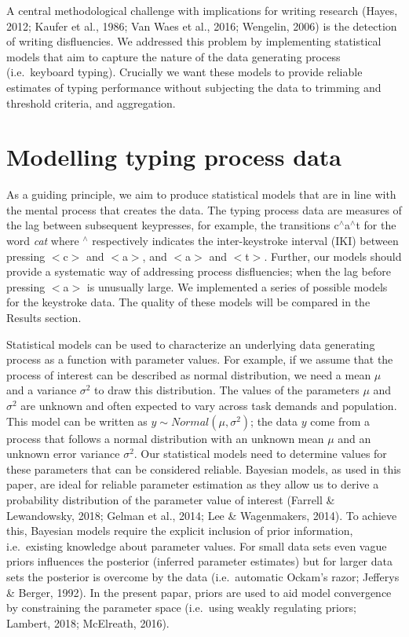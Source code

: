 \documentclass[english,man,floatsintext]{apa7}
\begin{document}
A central methodological challenge with implications for writing research (Hayes, 2012; Kaufer et al., 1986; Van Waes et al., 2016; Wengelin, 2006) is the detection of writing disfluencies. We addressed this problem by implementing statistical models that aim to capture the nature of the data generating process (i.e.~keyboard typing). Crucially we want these models to provide reliable estimates of typing performance without subjecting the data to trimming and threshold criteria, and aggregation.

\hypertarget{modelling-typing-process-data}{%
\section{Modelling typing process data}\label{modelling-typing-process-data}}

As a guiding principle, we aim to produce statistical models that are in line with the mental process that creates the data. The typing process data are measures of the lag between subsequent keypresses, for example, the transitions c\(^{\wedge}\)a\(^{\wedge}\)t for the word \emph{cat} where \(^{\wedge}\) respectively indicates the inter-keystroke interval (IKI) between pressing \(<\)c\(>\) and \(<\)a\(>\), and \(<\)a\(>\) and \(<\)t\(>\). Further, our models should provide a systematic way of addressing process disfluencies; when the lag before pressing \(<\)a\(>\) is unusually large. We implemented a series of possible models for the keystroke data. The quality of these models will be compared in the Results section.

Statistical models can be used to characterize an underlying data generating process as a function with parameter values. For example, if we assume that the process of interest can be described as normal distribution, we need a mean \(\mu\) and a variance \(\sigma^2\) to draw this distribution. The values of the parameters \(\mu\) and \(\sigma^2\) are unknown and often expected to vary across task demands and population. This model can be written as \(y \sim Normal(\mu, \sigma^2)\); the data \(y\) come from a process that follows a normal distribution with an unknown mean \(\mu\) and an unknown error variance \(\sigma^2\). Our statistical models need to determine values for these parameters that can be considered reliable. Bayesian models, as used in this paper, are ideal for reliable parameter estimation as they allow us to derive a probability distribution of the parameter value of interest (Farrell \& Lewandowsky, 2018; Gelman et al., 2014; Lee \& Wagenmakers, 2014). To achieve this, Bayesian models require the explicit inclusion of prior information, i.e.~existing knowledge about parameter values. For small data sets even vague priors influences the posterior (inferred parameter estimates) but for larger data sets the posterior is overcome by the data (i.e.~automatic Ockam's razor; Jefferys \& Berger, 1992). In the present papar, priors are used to aid model convergence by constraining the parameter space (i.e.~using weakly regulating priors; Lambert, 2018; McElreath, 2016).
\end{document}
